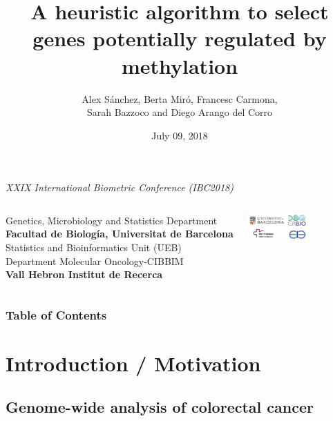 \documentclass[handout]{beamer}
\title[L-Shape Selection]{A heuristic algorithm to select genes potentially regulated by methylation}
\author[Alex S\'anchez]{Alex S\'anchez, Berta Mir\'o, Francesc Carmona, \\
	Sarah Bazzoco and Diego Arango del Corro}
\date[]{July 09, 2018}
\begin{document}
\begin{frame}
	
\begin{scriptsize}
\begin{center}
  \emph{ XXIX International Biometric Conference (IBC2018)}
\end{center}
\end{scriptsize}

\titlepage

\begin{columns}
   \scriptsize
   Genetics, Microbiology and Statistics Department \\ 
   \textbf{Facultad de Biología, Universitat de Barcelona}\\
   Statistics and Bioinformatics Unit (UEB)\\
   Department Molecular Oncology-CIBBIM \\ 
   \textbf{Vall Hebron Institut de Recerca}

  \hfill{}
  \includegraphics[height=1cm]{images/alllogos.png}
\end{columns}

\end{frame}


\begin{frame}
\frametitle{Table of Contents}
\tableofcontents
\end{frame}

\section{Introduction / Motivation}

\subsection{Genome-wide analysis of colorectal cancer}
\end{document}
